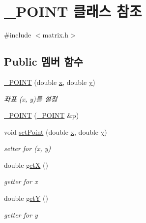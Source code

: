 \hypertarget{class___p_o_i_n_t}{\section{\-\_\-\-P\-O\-I\-N\-T 클래스 참조}
\label{class___p_o_i_n_t}
}


{\ttfamily \#include $<$matrix.\-h$>$}

\subsection*{Public 멤버 함수}
\begin{DoxyCompactItemize}
\item 
\hyperlink{class___p_o_i_n_t_aebc7d45f047362dce0d56e6cd530ad6c}{\-\_\-\-P\-O\-I\-N\-T} (double \hyperlink{class___p_o_i_n_t_a6ee692c537dddb23fb74564a3d197d0c}{x}, double \hyperlink{class___p_o_i_n_t_a111acb89986d4cd271761fce3b8ea9ba}{y})
\begin{DoxyCompactList}\small\item\em 좌표 (x, y)를 설정 \end{DoxyCompactList}\item 
\hyperlink{class___p_o_i_n_t_af974d7b50e7ba6074063d8427e4b9a2f}{\-\_\-\-P\-O\-I\-N\-T} (\hyperlink{class___p_o_i_n_t}{\-\_\-\-P\-O\-I\-N\-T} \&p)
\item 
void \hyperlink{class___p_o_i_n_t_a83d7143450421cccb3429d3da3df1ac3}{set\-Point} (double \hyperlink{class___p_o_i_n_t_a6ee692c537dddb23fb74564a3d197d0c}{x}, double \hyperlink{class___p_o_i_n_t_a111acb89986d4cd271761fce3b8ea9ba}{y})
\begin{DoxyCompactList}\small\item\em setter for (x, y) \end{DoxyCompactList}\item 
double \hyperlink{class___p_o_i_n_t_aa45385011e59d7e3124bed2e889bafa5}{get\-X} ()
\begin{DoxyCompactList}\small\item\em getter for x \end{DoxyCompactList}\item 
double \hyperlink{class___p_o_i_n_t_a90459303c88af3a2046bb85d4033b524}{get\-Y} ()
\begin{DoxyCompactList}\small\item\em getter for y \end{DoxyCompactList}\end{DoxyCompactItemize}
